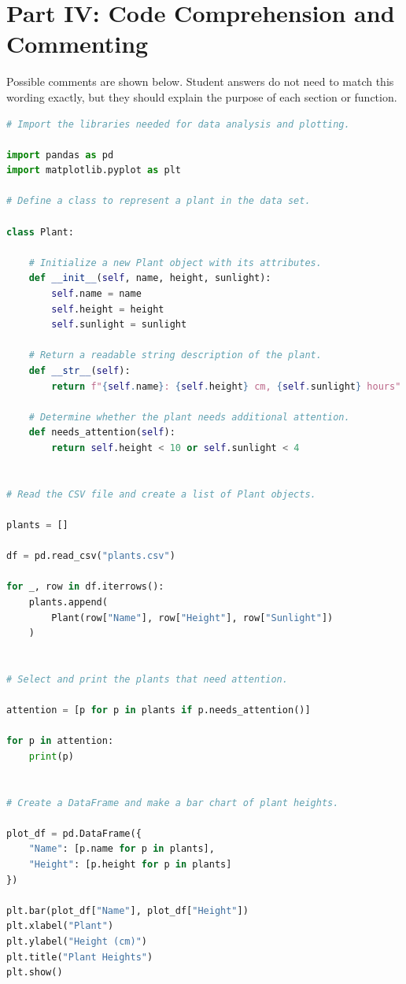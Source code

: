 \documentclass[12pt]{article}
\begin{document}
\section*{Part IV: Code Comprehension and Commenting}

Possible comments are shown below. Student answers do not need to match this wording exactly, but they should explain the purpose of each section or function.

\begin{lstlisting}[language=Python]
# Import the libraries needed for data analysis and plotting.

import pandas as pd
import matplotlib.pyplot as plt

# Define a class to represent a plant in the data set.

class Plant:

    # Initialize a new Plant object with its attributes.
    def __init__(self, name, height, sunlight):
        self.name = name
        self.height = height
        self.sunlight = sunlight

    # Return a readable string description of the plant.
    def __str__(self):
        return f"{self.name}: {self.height} cm, {self.sunlight} hours"

    # Determine whether the plant needs additional attention.
    def needs_attention(self):
        return self.height < 10 or self.sunlight < 4


# Read the CSV file and create a list of Plant objects.

plants = []

df = pd.read_csv("plants.csv")

for _, row in df.iterrows():
    plants.append(
        Plant(row["Name"], row["Height"], row["Sunlight"])
    )


# Select and print the plants that need attention.

attention = [p for p in plants if p.needs_attention()]

for p in attention:
    print(p)


# Create a DataFrame and make a bar chart of plant heights.

plot_df = pd.DataFrame({
    "Name": [p.name for p in plants],
    "Height": [p.height for p in plants]
})

plt.bar(plot_df["Name"], plot_df["Height"])
plt.xlabel("Plant")
plt.ylabel("Height (cm)")
plt.title("Plant Heights")
plt.show()
\end{lstlisting}
\end{document}
